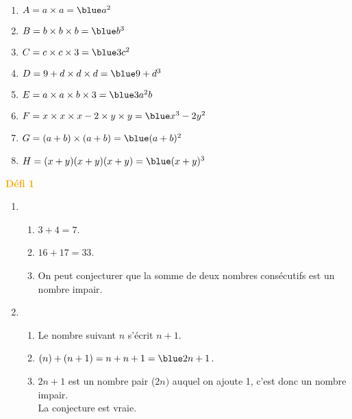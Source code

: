 \begin{colonne*exercice}
\begin{corrige}
   \ \\ [-5mm]
   \begin{enumerate}
      \item $A =a\times a =\blue a^2$
      \item $B =b\times b\times b =\blue b^3$
      \item $C =c\times c\times3 =\blue3c^2$
      \item $D =9+d\times d\times d =\blue9+d^3$
      \item $E =a\times a\times b\times3 =\blue3a^2b$
      \item $F =x\times x\times x-2\times y\times y =\blue x^3-2y^2$
      \item $G =(a+b)\times(a+b) =\blue(a+b)^2$
      \item $H =(x+y)(x+y)(x+y) =\blue(x+y)^3$ \medskip
   \end{enumerate}

\bigskip
{}
\medskip

\hspace*{-7.5mm} \textcolor{orange}{\bf Défi 1} \\
   \begin{enumerate}
      \item
      \begin{enumerate}
         \item {\blue $3+4 =7$}.
         \item {\blue $16+17 =33$}.
         \item On peut conjecturer que  {\blue la somme de deux nombres consécutifs est un nombre impair}.
      \end{enumerate}
      \item
      \begin{enumerate}
         \item Le nombre suivant $n$ s'écrit {\blue $n+1$}.
         \item $(n)+(n+1) =n+n+1 ={\blue 2n+1}$.
         \item $2n+1$ est un nombre pair ($2n)$ auquel on ajoute 1, c'est donc un nombre impair. \\
            {\blue La conjecture est vraie}. \bigskip
      \end{enumerate}
   \end{enumerate}


\end{corrige}
\end{colonne*exercice}
